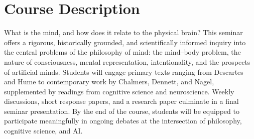 \section{Course Description}

What is the mind, and how does it relate to the physical brain? This seminar offers a
rigorous, historically grounded, and scientifically informed inquiry into the central problems
of the philosophy of mind: the mind–body problem, the nature of consciousness, mental
representation, intentionality, and the prospects of artificial minds. Students will engage
primary texts ranging from Descartes and Hume to contemporary work by Chalmers, Dennett,
and Nagel, supplemented by readings from cognitive science and neuroscience. Weekly
discussions, short response papers, and a research paper culminate in a final seminar
presentation. By the end of the course, students will be equipped to participate meaningfully
in ongoing debates at the intersection of philosophy, cognitive science, and AI.

